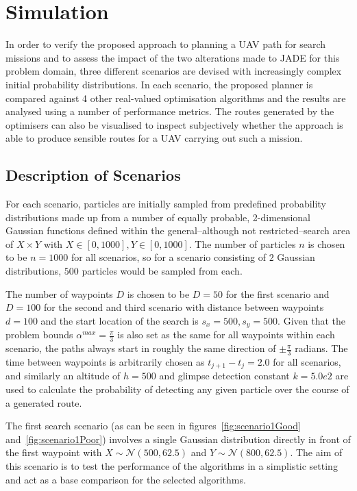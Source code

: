 \documentclass[10pt,a4paper, oneside, conference]{IEEEtran}
\begin{document}
	\section{Simulation}
	\label{section:method}
	
	In order to verify the proposed approach to planning a UAV path for search missions and to assess the impact of the two alterations made to JADE for this problem domain, three different scenarios are devised with increasingly complex initial probability distributions.
	In each scenario, the proposed planner is compared against 4 other real-valued optimisation algorithms and the results are analysed using a number of performance metrics.
	The routes generated by the optimisers can also be visualised to inspect subjectively whether the approach is able to produce sensible routes for a UAV carrying out such a mission.
	
	\subsection{Description of Scenarios}
	For each scenario, particles are initially sampled from predefined probability distributions made up from a number of equally probable, 2-dimensional Gaussian functions defined within the general--although not restricted--search area of $X\times Y$ with $X\in[0,1000],Y\in[0,1000]$.
	The number of particles $n$ is chosen to be $n=1000$ for all scenarios, so for a scenario consisting of $2$ Gaussian distributions, $500$ particles would be sampled from each.
	
	The number of waypoints $D$ is chosen to be $D=50$ for the first scenario and $D=100$ for the second and third scenario with distance between waypoints $d=100$ and the start location of the search is $s_x=500,s_y=500$.
	Given that the problem bounds $\alpha^{max}=\frac{\pi}{3}$ is also set as the same for all waypoints within each scenario, the paths always start in roughly the same direction of $\pm \frac{\pi}{3}$ radians.
	The time between waypoints is arbitrarily chosen as $t_{j+1}-t_j=2.0$ for all scenarios, and similarly an altitude of $h=500$ and glimpse detection constant $k=5.0e2$ are used to calculate the probability of detecting any given particle over the course of a generated route.
	
	The first search scenario (as can be seen in figures~\ref{fig:scenario1Good} and~\ref{fig:scenario1Poor}) involves a single Gaussian distribution directly in front of the first waypoint with $X\sim \mathcal{N}(500,62.5)$ and $Y\sim \mathcal{N}(800,62.5)$.
	The aim of this scenario is to test the performance of the algorithms in a simplistic setting and act as a base comparison for the selected algorithms.
	
\end{document}
